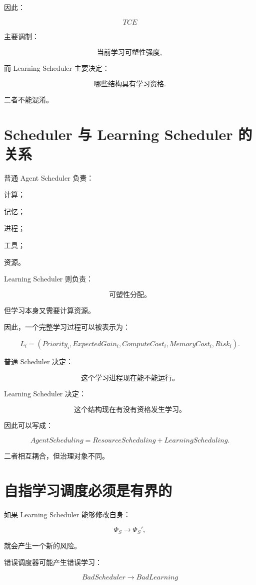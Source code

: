 因此：

\[
\boxed{
TCE
}
\]

主要调制：

\[
\boxed{
\text{当前学习可塑性强度},
}
\]

而 Learning Scheduler 主要决定：

\[
\boxed{
\text{哪些结构具有学习资格}.
}
\]

二者不能混淆。


\section{Scheduler 与 Learning Scheduler 的关系}

普通 Agent Scheduler 负责：

计算；

记忆；

进程；

工具；

资源。

Learning Scheduler 则负责：

\[
\boxed{
\text{可塑性分配。}
}
\]

但学习本身又需要计算资源。

因此，一个完整学习过程可以被表示为：

\[
L_i
=
(
Priority_i,
ExpectedGain_i,
ComputeCost_i,
MemoryCost_i,
Risk_i
).
\]

普通 Scheduler 决定：

\[
\boxed{
\text{这个学习进程现在能不能运行。}
}
\]

Learning Scheduler 决定：

\[
\boxed{
\text{这个结构现在有没有资格发生学习。}
}
\]

因此可以写成：

\[
\boxed{
AgentScheduling
=
ResourceScheduling
+
LearningScheduling.
}
\]

二者相互耦合，但治理对象不同。


\section{自指学习调度必须是有界的}

如果 Learning Scheduler 能够修改自身：

\[
\Phi_S
\rightarrow
\Phi_S',
\]

就会产生一个新的风险。

错误调度器可能产生错误学习：

\[
BadScheduler
\rightarrow
BadLearning
\]

